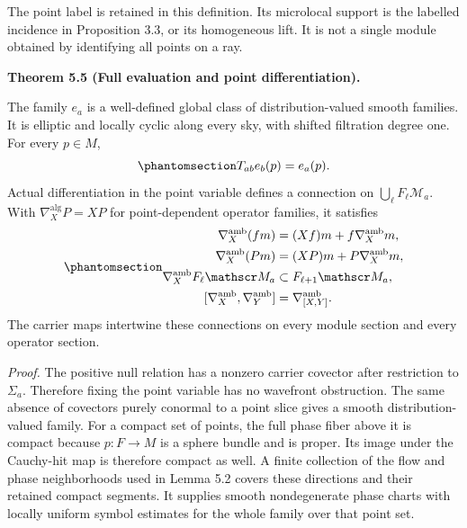 \documentclass[
  english,
  11pt,
  reqno]{amsart}
\makeatletter
\newcommand{\pandocstatementheading}[1]{%
  \par\addpenalty{\@beginparpenalty}%
  \addvspace{.5\baselineskip plus .2\baselineskip minus .2\baselineskip}%
  {\normalfont\bfseries #1\par}%
  \nobreak\@afterindenttrue\@afterheading
}
\makeatother
\begin{document}
The point label is retained in this definition. Its microlocal support
is the labelled incidence in Proposition 3.3, or its homogeneous lift.
It is not a single module obtained by identifying all points on a ray.

\pandocstatementheading{\protect{}\label{thm:global-evaluation-and-point-connection}Theorem 5.5 (Full evaluation and point differentiation).}

The family \(e_a\) is a well-defined global class of distribution-valued
smooth families. It is elliptic and locally cyclic along every sky, with
shifted filtration degree one. For every \(p\in M\),
\begin{equation}\protect\phantomsection\label{eq:global-evaluation-covariance}{
T_{ab}e_b(p)=e_a(p).
}\end{equation} Actual differentiation in the point variable defines a
connection on \(\bigcup_\ell F_\ell\mathscr M_a\). With
\(\nabla_X^{\mathrm{alg}}P=XP\) for point-dependent operator families,
it satisfies
\begin{equation}\protect\phantomsection\label{eq:global-point-connection}{
\begin{aligned}
\nabla_X^{\mathrm{amb}}(fm)&=(Xf)m+f\nabla_X^{\mathrm{amb}}m,\\
\nabla_X^{\mathrm{amb}}(Pm)&=(XP)m+P\nabla_X^{\mathrm{amb}}m,\\
\nabla_X^{\mathrm{amb}}F_\ell\mathscr M_a&\subset F_{\ell+1}\mathscr M_a,\\
[\nabla_X^{\mathrm{amb}},\nabla_Y^{\mathrm{amb}}]
&=\nabla_{[X,Y]}^{\mathrm{amb}}.
\end{aligned}
}\end{equation} The carrier maps intertwine these connections on every
module section and every operator section.

\emph{Proof.} The positive null relation has a nonzero carrier covector
after restriction to \(\Sigma_a\). Therefore fixing the point variable
has no wavefront obstruction. The same absence of covectors purely
conormal to a point slice gives a smooth distribution-valued family. For
a compact set of points, the full phase fiber above it is compact
because \(p:F\to M\) is a sphere bundle and is proper. Its image under
the Cauchy-hit map is therefore compact as well. A finite collection of
the flow and phase neighborhoods used in Lemma 5.2 covers these
directions and their retained compact segments. It supplies smooth
nondegenerate phase charts with locally uniform symbol estimates for the
whole family over that point set.
\end{document}
